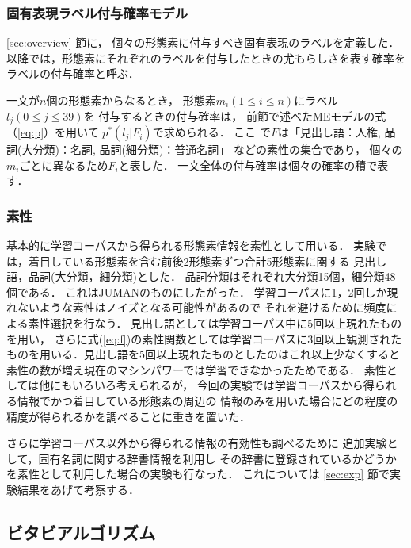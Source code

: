 \subsubsection{固有表現ラベル付与確率モデル}
\label{sec:named_entity_extraction_model}

\ref{sec:overview} 節に，
個々の形態素に付与すべき固有表現のラベルを定義した．
以降では，形態素にそれぞれのラベルを付与したときの尤もらしさを表す確率を
ラベルの付与確率と呼ぶ．

一文が$n$個の形態素からなるとき，
形態素$m_i (1\leq i\leq n)$にラベル$l_j (0\leq j\leq 39)$を
付与するときの付与確率は，
前節で述べたMEモデルの式（\ref{eq:p}）を用いて
$p^{*}(l_{j}|F_{i})$で求められる．
ここ\break
で$F$は「見出し語：人権, 品詞(大分類)：名詞, 品詞(細分類)：普通名詞」
などの素性の集合であり，
個々の$m_i$ごとに異なるため$F_i$と表した．
一文全体の付与確率は個々の確率の積で表す．
\vspace{-2mm}
\subsubsection{素性}
\label{sec:features}

基本的に学習コーパスから得られる形態素情報を素性として用いる．
実験では，着目している形態素を含む前後2形態素ずつ合計5形態素に関する
見出し語，品詞(大分類，細分類)とした．
品詞分類はそれぞれ大分類15個，細分類48個である．
これはJUMANのものにしたがった．
学習コーパスに1，2回しか現れないような素性はノイズとなる可能性があるので
それを避けるために頻度による素性選択を行なう．
見出し語としては学習コーパス中に5回以上現れたものを用い，
さらに式(\ref{eq:f})の素性関数としては学習コーパスに3回以上観測された
ものを用いる．見出し語を5回以上現れたものとしたのはこれ以上少なくすると
素性の数が増え現在のマシンパワーでは学習できなかったためである．
素性としては他にもいろいろ考えられるが，
今回の実験では学習コーパスから得られる情報でかつ着目している形態素の周辺の
情報のみを用いた場合にどの程度の精度が得られるかを調べることに重きを置いた．

さらに学習コーパス以外から得られる情報の有効性も調べるために
追加実験として，固有名詞に関する辞書情報を利用し
その辞書に登録されているかどうかを素性として利用した場合の実験も行なった．
これについては \ref{sec:exp} 節で実験結果をあげて考察する．

\subsection{ビタビアルゴリズム}
\label{sec:viterbi}

